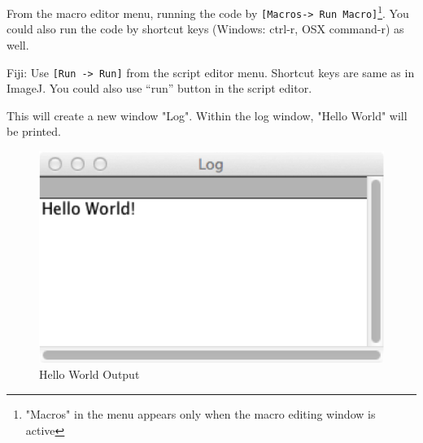 \documentclass[11pt,a4paper,oneside]{report}
\newenvironment{indentFiji}%
{\begin{list}{}%
         {\setlength{\leftmargin}{1em}}%
         \item[]%
}
{\end{list}}
\newcommand{\ijmenu}[1]{\texttt{\small#1}}
\begin{document}
From the macro editor menu, running the code by \ijmenu{[Macros->
Run Macro]}\footnote{"Macros" in the menu appears only when the macro editing
window is active}. You could also run the code by shortcut keys (Windows:
ctrl-r, OSX command-r) as well. 
 
\begin{indentFiji}
Fiji:  Use \ijmenu{[Run -> Run]} from the script editor menu. Shortcut keys are
same as in ImageJ. You could also use ``run'' button in the script editor. 
\end{indentFiji}
This will create a new window "Log". Within the log window, "Hello World" will
be printed.

\begin{figure}[hbtp]
\begin{center}
\includegraphics[scale=1.0]{fig/helloworld_logwindow.png}
\caption{Hello World Output} \label{fig_HelloWorldLog}
\end{center}
\end{figure}
\end{document}
